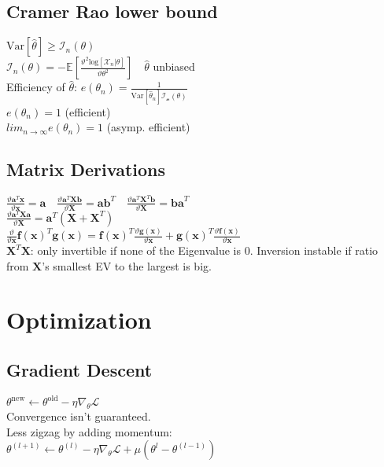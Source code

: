 \subsection*{Cramer Rao lower bound}
$\mathrm{Var}[\hat{\theta}]\geq \mathcal{I}_n(\theta)$\\
$\mathcal{I}_n(\theta) = -\mathbb{E}[\frac{\vartheta^2 \mathrm{log}[\mathcal{X}_n|\theta]}{\vartheta \theta^2}] \quad \hat{\theta}$ unbiased\\
Efficiency of $\hat{\theta}$: $e(\theta_n)=\frac{1}{\mathrm{Var}[\hat{\theta}_n]\mathcal{I_n(\theta)}}$\\
$e(\theta_n) = 1$ (efficient)\\
$lim_{n\rightarrow\infty}e(\theta_n) = 1$ (asymp. efficient)

\subsection*{Matrix Derivations}
$\frac{\vartheta \mathbf{a}^T\mathbf{x}}{\vartheta\mathbf{x}}{=}\mathbf{a} \quad \frac{\vartheta \mathbf{a}^T\mathbf{Xb}}{\vartheta\mathbf{X}}{=}\mathbf{ab}^T \quad \frac{\vartheta \mathbf{a}^T\mathbf{X}^T\mathbf{b}}{\vartheta\mathbf{X}}{=}\mathbf{ba}^T $\\
$\frac{\vartheta \mathbf{a}^T\mathbf{Xa}}{\vartheta\mathbf{X}}{=}\mathbf{a}^T(\mathbf{X}+\mathbf{X}^T)$\\
 $\frac{\vartheta}{\vartheta\mathbf{x}} \mathbf{f(x)}^T\mathbf{g(x)}{=}\mathbf{f(x)}^T\frac{\vartheta \mathbf{g(x)}}{\vartheta\mathbf{x}}+\mathbf{g(x)}^T\frac{\vartheta\mathbf{f(x)}}{\vartheta\mathbf{x}}$\\
$\mathbf{X}^T\mathbf{X}$: only invertible if none of the Eigenvalue is $0$.
Inversion instable if ratio from $\mathbf{X}$'s smallest EV to the largest is big.

\section*{Optimization}
\subsection*{Gradient Descent}
$\theta^{\mathrm{new}}\leftarrow\theta^{\mathrm{old}}-\eta\nabla_{\theta}\mathcal{L}$\\
Convergence isn't guaranteed.\\
Less zigzag by adding momentum: \\$\theta^{(l+1)}\leftarrow\theta^{(l)}-\eta\nabla_{\theta}\mathcal{L}+\mu(\theta^{l}-\theta^{(l-1)})$

